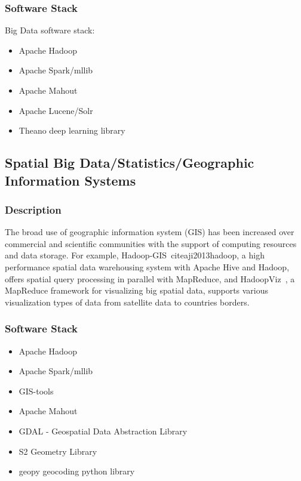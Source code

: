 \documentclass[9pt,twocolumn,twoside]{styles/osajnl}
\begin{document}
\subsubsection{Software Stack}

Big Data software stack:

\begin{itemize}
\item Apache Hadoop
\item Apache Spark/mllib
\item Apache Mahout
\item Apache Lucene/Solr
\item Theano deep learning library
\end{itemize}



\subsection{Spatial Big Data/Statistics/Geographic Information Systems}

\subsubsection{Description}

The broad use of geographic information system (GIS) has been increased over
commercial and scientific communities with the support of computing resources
and data storage. For example, Hadoop-GIS~cite{aji2013hadoop}, a high
performance spatial data warehousing system with Apache Hive and Hadoop, offers
spatial query processing in parallel with MapReduce, and
HadoopViz~\cite{eldawy2016hadoopviz}, a MapReduce framework for
visualizing big spatial data, supports various visualization types of data from
satellite data to countries borders.


\subsubsection{Software Stack}

\begin{itemize}
\item Apache Hadoop
\item Apache Spark/mllib
\item GIS-tools
\item Apache Mahout
\item GDAL - Geospatial Data Abstraction Library
\item S2 Geometry Library
\item geopy geocoding python library
\end{itemize}
\end{document}
